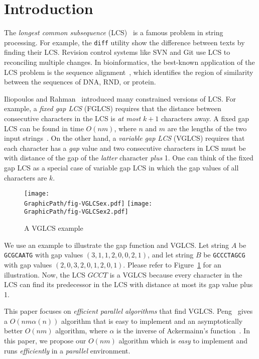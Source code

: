 \section{Introduction} %
\label{sec:Introduction}

The {\em longest common subsequence} (LCS)~\cite{Hirschberg1975ALS} is a
famous problem in string processing.  For example, the {\tt diff}
utility show the difference between texts by finding their LCS. Revision
control systems like SVN and Git use LCS to reconciling multiple
changes.  In bioinformatics, the best-known application of the LCS
problem is the sequence alignment~\cite{mount2001bioinformatics,
Ann2010EfficientAF}, which identifies the region of similarity between
the sequences of DNA, RND, or protein.

Iliopoulos and Rahman~\cite{Rahman2006AlgorithmsFC} introduced many
constrained versions of LCS.  For example, a {\em fixed gap LCS} (FGLCS)
requires that the distance between consecutive characters in the LCS is
{\em at most} $k + 1$ characters away.  A fixed gap LCS can be found in
time $O(nm)$, where $n$ and $m$ are the lengths of the two input
strings~\cite{Rahman2006AlgorithmsFC}.  On the other hand, a {\em
variable gap LCS} (VGLCS) requires that each character has a {\em gap}
value and two consecutive characters in LCS must be with distance of the
gap of the {\em latter} character {\em plus} 1.  One can think of the
fixed gap LCS as a special case of variable gap LCS in which the gap
values of all characters are $k$.

\begin{figure}[!thb]
  \centering
  \texttt{[image: \\GraphicPath/fig-VGLCSex.pdf]}
  \texttt{[image: \\GraphicPath/fig-VGLCSex2.pdf]}
  \caption{A VGLCS example} \label{fig:VGLCSex}
\end{figure}

We use an example to illustrate the gap function and VGLCS.  Let string
$A$ be {\tt GCGCAATG} with gap values $(3, 1, 1, 2, 0, 0, 2, 1)$, and
let string $B$ be {\tt GCCCTAGCG} with gap values $(2, 0, 3, 2, 0, 1, 2,
0, 1)$.  Please refer to Figure~\ref{fig:VGLCSex} for an illustration.
Now, the LCS $GCCT$ is a VGLCS because every character in the LCS can
find its predecessor in the LCS with distance at most its gap value plus
1.

This paper focuses on {\em efficient parallel algorithms} that find
VGLCS.  Peng~\cite{Peng2011TheLC} gives a $O(nm \alpha(n))$ algorithm
that is easy to implement and an asymptotically better $O(nm)$
algorithm, where $\alpha$ is the inverse of Ackermainn's
function~\cite{Banachowski1980ACT}.  In this paper, we propose our
$O(nm)$ algorithm which is {\em easy} to implement and runs {\em
efficiently} in a {\em parallel} environment.

